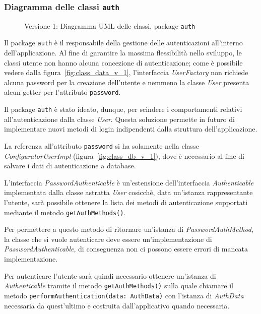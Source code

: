 \subsubsection{Diagramma delle classi \texttt{auth}}
\vspace{0.5cm}
\begin{figure}[H]
    \centering
    \caption{Versione 1: Diagramma UML delle classi, package \texttt{auth}}
    \label{fig:class_auth_v_1}
\end{figure}

Il package \texttt{auth} è il responsabile della gestione delle autenticazioni all'interno dell'applicazione.
Al fine di garantire la massima flessibilità nello sviluppo, le classi utente non hanno alcuna concezione di autenticazione;
come è possibile vedere dalla figura~\ref{fig:class_data_v_1}, l'interfaccia \textit{UserFactory} non richiede alcuna password
per la creazione dell'utente e nemmeno la classe \textit{User} presenta alcun getter per l'attributo \texttt{password}.

Il package \texttt{auth} è stato ideato, dunque, per scindere i comportamenti relativi all'autenticazione dalla classe \textit{User}.
Questa soluzione permette in futuro di implementare nuovi metodi di login indipendenti dalla struttura dell'applicazione.

La referenza all'attributo \texttt{password} si ha solamente nella classe \textit{ConfiguratorUserImpl} (figura~\ref{fig:class_db_v_1}),
dove è necessario al fine di salvare i dati di autenticazione a database.

L'interfaccia \textit{PasswordAuthenticable} è un'estensione dell'interfaccia \textit{Authenticable} implementata dalla classe astratta
\textit{User} cosicchè, data un'istanza rappresentante l'utente, sarà possibile ottenere la lista dei metodi di autenticazione supportati
mediante il metodo \texttt{getAuthMethods()}.

Per permettere a questo metodo di ritornare un'istanza di \textit{PasswordAuthMethod}, la classe che si vuole autenticare deve essere un'implementazione
di \textit{PasswordAuthenticable}, di conseguenza non ci possono essere errori di mancata implementazione.

Per autenticare l'utente sarà quindi necessario ottenere un'istanza di \textit{Authenticable} tramite il metodo \texttt{getAuthMethods()}
sulla quale chiamare il metodo \texttt{performAuthentication(data: AuthData)} con l'istanza di \textit{AuthData}
necessaria da quest'ultimo e costruita dall'applicativo quando necessaria.